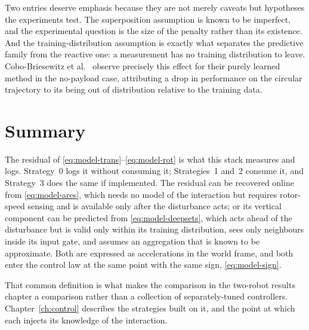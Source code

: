 Two entries deserve emphasis because they are not merely caveats but hypotheses the experiments
test. The superposition assumption is known to be imperfect, and the experimental question is the
size of the penalty rather than its existence. And the training-distribution assumption is exactly
what separates the predictive family from the reactive one: a measurement has no training
distribution to leave. Cobo-Briesewitz et al.~\cite{cobobriesewitz2026lindi} observe precisely this
effect for their purely learned method in the no-payload case, attributing a drop in performance on
the circular trajectory to its being out of distribution relative to the training data.

\section{Summary}
\label{sec:model-summary}

The residual of \eqref{eq:model-trans}--\eqref{eq:model-rot} is what this stack measures and logs.
Strategy~0 logs it without consuming it; Strategies~1 and~2 consume it, and Strategy~3 does the
same if implemented. The residual can be recovered online from
\eqref{eq:model-ares}, which needs no model of the interaction but requires rotor-speed sensing and
is available only after the disturbance acts; or its vertical component can be predicted from
\eqref{eq:model-deepsets}, which acts ahead of the disturbance but is valid only within its training
distribution, sees only neighbours inside its input gate, and assumes an aggregation that is known
to be approximate. Both are expressed as accelerations in the world frame, and both enter the
control law at the same point with the same sign, \eqref{eq:model-sign}.

That common definition is what makes the comparison in the two-robot results chapter a
comparison rather than a collection of separately-tuned controllers. Chapter~\ref{ch:control}
describes the strategies built on it, and the point at which each injects its knowledge of
the interaction.
